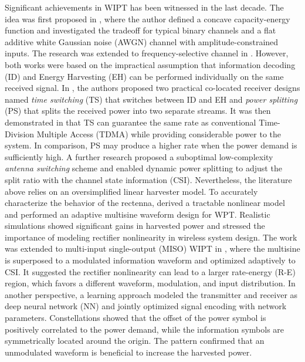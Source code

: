 Significant achievements in WIPT has been witnessed in the last decade. The idea was first proposed in \cite{R.Varshney2008}, where the author defined a concave capacity-energy function and investigated the tradeoff for typical binary channels and a flat additive white Gaussian noise (AWGN) channel with amplitude-constrained inputs. The research was extended to frequency-selective channel in \cite{Grover2010}. However, both works were based on the impractical assumption that information decoding (ID) and Energy Harvesting (EH) can be performed individually on the same received signal. In \cite{Zhang2013}, the authors proposed two practical co-located receiver designs named \textit{time switching} (TS) that switches between ID and EH and \textit{power splitting} (PS) that splits the received power into two separate streams. It was then demonstrated in \cite{Zhou2013a} that TS can guarantee the same rate as conventional Time-Division Multiple Access (TDMA) while providing considerable power to the system. In comparison, PS may produce a higher rate when the power demand is sufficiently high. A further research \cite{Liu2013} proposed a suboptimal low-complexity \textit{antenna switching} scheme and enabled dynamic power splitting to adjust the split ratio with the channel state information (CSI). Nevertheless, the literature above relies on an oversimplified linear harvester model. To accurately characterize the behavior of the rectenna, \cite{Clerckx2016} derived a tractable nonlinear model and performed an adaptive multisine waveform design for WPT. Realistic simulations showed significant gains in harvested power and stressed the importance of modeling rectifier nonlinearity in wireless system design. The work was extended to multi-input single-output (MISO) WIPT in \cite{Clerckx2018}, where the multisine is superposed to a modulated information waveform and optimized adaptively to CSI. It suggested the rectifier nonlinearity can lead to a larger rate-energy (R-E) region, which favors a different waveform, modulation, and input distribution. In another perspective, a learning approach \cite{Varasteh2018} modeled the transmitter and receiver as deep neural network (NN) and jointly optimized signal encoding with network parameters. Constellations showed that the offset of the power symbol is positively correlated to the power demand, while the information symbols are symmetrically located around the origin. The pattern confirmed that an unmodulated waveform is beneficial to increase the harvested power.
